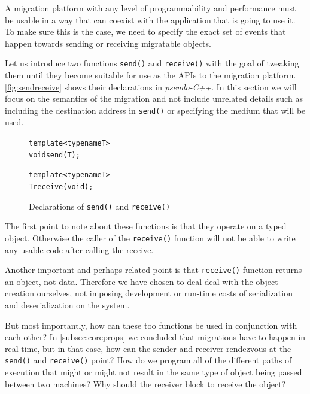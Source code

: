 A migration platform with any level of programmability and performance
must be usable in a way that can coexist with the application that is
going to use it. To make sure this is the case, we need to specify the
exact set of events that happen towards sending or receiving migratable
objects.

Let us introduce two functions \texttt{send()} and \texttt{receive()} with
the goal of tweaking them until they become suitable for use as the APIs
to the migration platform. \autoref{fig:sendreceive} shows their
declarations in \emph{pseudo-C++}. In this section we will focus on
the semantics of the migration and not include unrelated details such as
including the destination address in \texttt{send()} or specifying
the medium that will be used.



\begin{figure}[t]
\begin{alltt}

template<typename T>
void send(T);

template<typename T>
T receive(void);

\end{alltt}
\caption{
    Declarations of \texttt{send()} and \texttt{receive()}
}
\label{fig:sendreceive}
\end{figure}



The first point to note about these functions is that they operate on
a typed object. Otherwise the caller of the \texttt{receive()} function
will not be able to write any usable code after calling the receive.

Another important and perhaps related point is that \texttt{receive()}
function returns an object, not data. Therefore we have chosen to deal
deal with the object creation ourselves, not imposing development or
run-time costs of serialization and deserialization on the system.

But most importantly, how can these too functions be used in conjunction
with each other? In \autoref{subsec:coreprops} we concluded that
migrations have to happen in real-time, but in that case, how can the
sender and receiver rendezvous at the \texttt{send()} and
\texttt{receive()} point? How do we program all of the different paths of
execution that might or might not result in the same type of object being
passed between two machines? Why should the receiver block to receive the
object?

